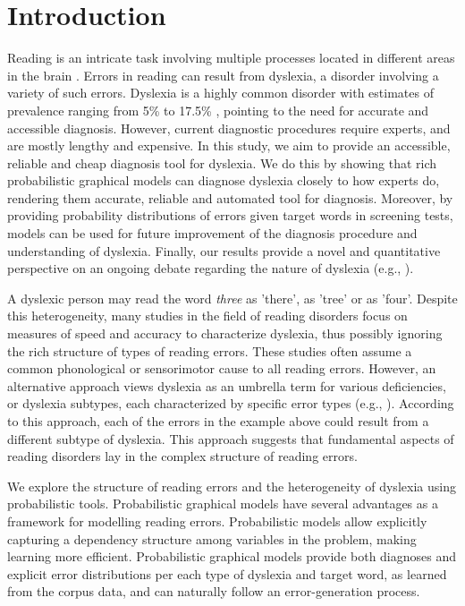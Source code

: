 
\section{Introduction}
Reading is an intricate task involving multiple processes located in different areas in the brain \citep{price2012review}. Errors in reading can result from dyslexia, a disorder involving a variety of such errors. Dyslexia is a highly common disorder with estimates of prevalence ranging from 5\% to 17.5\% \citep{ss05}, pointing to the need for accurate and accessible diagnosis. However, current diagnostic procedures require experts, and are mostly lengthy and expensive. In this study, we aim to provide an accessible, reliable and cheap diagnosis tool for dyslexia. We do this by showing that rich probabilistic graphical models can diagnose dyslexia closely to how experts do, rendering them accurate, reliable and automated tool for diagnosis. Moreover, by providing probability distributions of errors given target words in screening tests, models can be used for future improvement of the diagnosis procedure and understanding of dyslexia. Finally, our results provide a novel and quantitative perspective on an ongoing debate regarding the nature of dyslexia (e.g., \citealp{eg14}).

A dyslexic person may read the word {\it three} as 'there', as 'tree' or as 'four'. Despite this heterogeneity, many studies in the field of reading disorders focus on measures of speed and accuracy to characterize dyslexia, thus possibly ignoring the rich structure of types of reading errors. These studies often assume a common phonological \citep{r14, rrddcw03, s98, s01} or sensorimotor \citep{s01} cause to all reading errors. However, an alternative approach views dyslexia as an umbrella term for various deficiencies, or dyslexia subtypes, each characterized by specific error types (e.g., \citealp{mn73, ellis2013human, ck12, friedmann2016types}). According to this approach, each of the errors in the example above could result from a different subtype of dyslexia. This approach suggests that fundamental aspects of reading disorders lay in the complex structure of reading errors.

We explore the structure of reading errors and the heterogeneity of dyslexia using probabilistic tools. Probabilistic graphical models have several advantages as a framework for modelling reading errors. Probabilistic models allow explicitly capturing a dependency structure among variables in the problem, making learning more efficient. Probabilistic graphical models provide both diagnoses and explicit error distributions per each type of dyslexia and target word, as learned from the corpus data, and can naturally follow an error-generation process.

